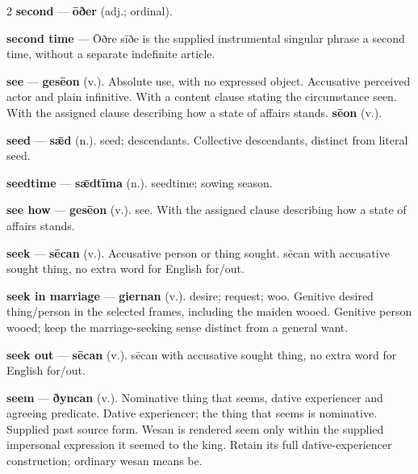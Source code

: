 \begin{multicols}{2}
\textbf{second} — \textbf{ōðer} (adj.; ordinal).\par
\textbf{second time} — Ōðre sīðe is the supplied instrumental singular phrase a second time, without a separate indefinite article.\par
\textbf{see} — \textbf{gesēon} (v.). Absolute use, with no expressed object. Accusative perceived actor and plain infinitive. With a content clause stating the circumstance seen. With the assigned clause describing how a state of affairs stands. \textbf{sēon} (v.).\par
\textbf{seed} — \textbf{sǣd} (n.). seed; descendants. Collective descendants, distinct from literal seed.\par
\textbf{seedtime} — \textbf{sǣdtīma} (n.). seedtime; sowing season.\par
\textbf{see how} — \textbf{gesēon} (v.). see. With the assigned clause describing how a state of affairs stands.\par
\textbf{seek} — \textbf{sēcan} (v.). Accusative person or thing sought. sēcan with accusative sought thing, no extra word for English for/out.\par
\textbf{seek in marriage} — \textbf{giernan} (v.). desire; request; woo. Genitive desired thing/person in the selected frames, including the maiden wooed. Genitive person wooed; keep the marriage-seeking sense distinct from a general want.\par
\textbf{seek out} — \textbf{sēcan} (v.). sēcan with accusative sought thing, no extra word for English for/out.\par
\textbf{seem} — \textbf{ðyncan} (v.). Nominative thing that seems, dative experiencer and agreeing predicate. Dative experiencer; the thing that seems is nominative. Supplied past source form. Wesan is rendered seem only within the supplied impersonal expression it seemed to the king. Retain its full dative-experiencer construction; ordinary wesan means be.\par

\end{multicols}
